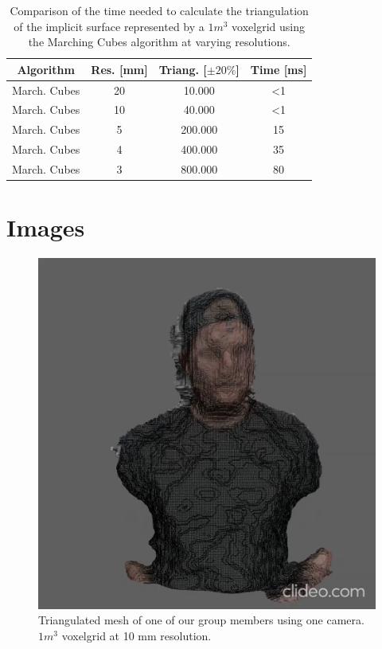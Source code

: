 \documentclass[10pt,twocolumn,letterpaper]{article}
\begin{document}
\begin{table}[h!]
  \begin{center}
    \begin{tabular}{c|c|c|c}
      \textbf{Algorithm} & \textbf{Res. [mm]} & \textbf{Triang. [$\pm 20\%$]}  & \textbf{Time [ms]}\\
      \hline
      March. Cubes & 20  & 10.000   & \textless 1\\
      March. Cubes & 10  & 40.000  & \textless 1\\
      March. Cubes & 5 & 200.000   & 15\\
      March. Cubes & 4 & 400.000   & 35\\
      March. Cubes & 3 & 800.000    & 80\\
    \end{tabular}
     \caption{Comparison of the time needed to calculate the triangulation of the implicit surface represented by a $1m^3$ voxelgrid using the Marching Cubes algorithm at varying resolutions.}
     \label{tab:marching-cubes}
  \end{center}
\end{table}

\clearpage
\section{Images}
\label{sec:images}

\begin{figure}[h!]
	\begin{center}
		\includegraphics[width=0.9\linewidth]{imgs/res2}
	\end{center}
	\caption{Triangulated mesh of one of our group members using one camera. $1m^3$ voxelgrid at 10 mm resolution.}
	\label{fig:wireframe}
\end{figure}
\end{document}
